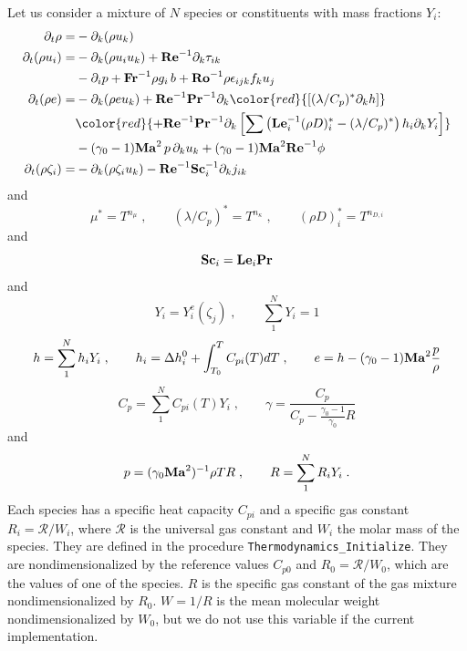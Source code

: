 Let us consider a mixture of $N$ species or constituents with mass fractions $Y_i$:
\begin{subequations}
    \begin{align}
        \partial_t \rho       =& -\partial_k (\rho u_k)                                                \\
        \partial_t (\rho u_i) =& -\partial_k (\rho u_i u_k )+\Re^{-1}\partial_k \tau_{ik}  \nonumber\\
        & -\partial_i p +\Fr^{-1} \rho g_i\,b +\Ro^{-1}\rho\epsilon_{ijk} f_ku_j                                     \\
        \partial_t (\rho e)   =& -\partial_k (\rho e u_k )+\Re^{-1}\Pr^{-1}\partial_k\color{red}{\left[(\lambda/C_p)^{*}\partial_kh\right]}\nonumber\\
        & \color{red}{+\Re^{-1}\Pr^{-1} \partial_k\left[\sum\left(\Le_i^{-1}(\rho D)_i^*
        -(\lambda/C_p)^*\right)h_i \partial_k  Y_i\right]}                                  \nonumber\\
        & -(\gamma_0-1)\Ma^2\,p\, \partial_k u_k  + (\gamma_0-1)\Ma^2\Re^{-1}\phi                 \\
        \partial_t (\rho \zeta_i)=& -\partial_k (\rho \zeta_i u_k) -\Re^{-1}\Sc_i^{-1} \partial_k j_{ik}
    \end{align}
\end{subequations}
and
\begin{equation}
    \mu^{*} = T^{n_\mu}\;,\qquad (\lambda/C_p)^{*} = T^{n_\kappa} \;,\qquad (\rho
    D)_i^{*} = T^{n_{D,i}}
\end{equation}
and
\begin{equation}
    \mathrm{\bf Sc}_i = \mathrm{\bf Le}_i \mathrm{\bf Pr}
\end{equation}
and
\begin{equation}
    Y_i = Y^e_i(\zeta_j)\;, \qquad \sum^N_1 Y_i=1
\end{equation}
\begin{equation}
    h = \sum^N_1 h_{i} Y_i \;,\qquad h_{i} = \Delta h^0_i + \int^{T}_{T_0}
    C_{pi}(T) dT\;,\qquad e = h - (\gamma_0-1)\mathrm{\bf Ma}^2\frac{p}{\rho}
\end{equation}
\begin{equation}
    C_p = \sum^N_1 C_{pi}(T) Y_i\;,\qquad
    \gamma = \frac{C_p}{C_p-\frac{\gamma_0-1}{\gamma_0}R}
\end{equation}
and
\begin{equation}
    p = (\gamma_0 \mathrm{\bf Ma}^2)^{-1}\rho T R \;,\qquad
    R =\sum^N_1 R_iY_i\;.
\end{equation}
Each species has a specific heat capacity $C_{pi}$ and a specific gas constant $R_i=\mathcal{R}/W_i$,  where  $\mathcal{R}$ is the universal gas constant and $W_i$ the molar mass of the species. They are defined in the procedure \texttt{Thermodynamics\_Initialize}. They are nondimensionalized by the reference values $C_{p0}$ and $R_0=\mathcal{R}/W_0$, which are the values of one of the species. $R$ is the specific gas constant of the gas mixture nondimensionalized by $R_0$. $W=1/R$ is the mean molecular weight nondimensionalized by $W_0$, but we do not use this variable if the current implementation. 

